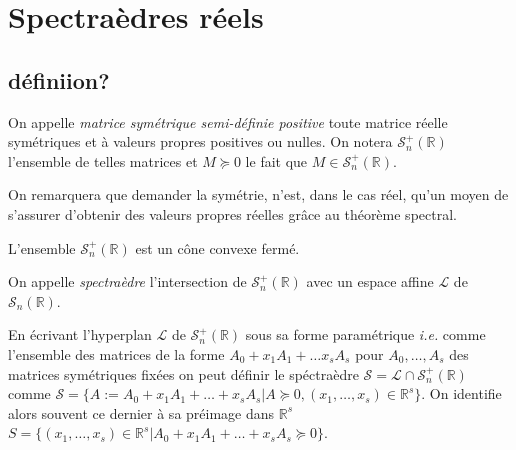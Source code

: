 \section{Spectraèdres réels}

\newcommand\ssp{symétrique semi-définie positive}
\newcommand\ssps{symétriques semi-définies positives}
\newcommand\Ssp{Symétrique semi-définie positive}
\newcommand\Ssps{Symétriques semi-définies positives}

\subsection{définiion?}

\begin{definition}
	On appelle \emph{matrice symétrique semi-définie positive} toute matrice réelle symétriques et à valeurs propres positives ou nulles.
	On notera $\mathcal{S}_n^+\left(\mathbb{R}\right) $ l'ensemble de telles matrices et $M \succeq 0$ le fait que $M \in \mathcal{S}_n^+\left(\mathbb{R}\right)$.
\end{definition}

\begin{remarque}
	On remarquera que demander la symétrie, n'est, dans le cas réel, qu'un moyen de s'assurer d'obtenir des valeurs propres réelles grâce au théorème spectral.
\end{remarque}
\begin{propriete}
	L'ensemble $\mathcal{S}_n^+\left( \mathbb{R} \right) $ est un cône convexe fermé.
\end{propriete}

\begin{definition}
	On appelle \emph{spectraèdre} l'intersection de $\mathcal{S}_n^+\left(\mathbb{R}\right)$ avec un espace affine $\mathcal{L}$ de $\mathcal{S}_n\left(\mathbb{R}\right)$.
\end{definition}

En écrivant l'hyperplan $\mathcal{L}$ de $\mathcal{S}_n^+\left(\mathbb{R}\right)$ sous sa forme paramétrique \textit{i.e.} comme l'ensemble des matrices de la forme $A_0 + x_1 A_1 + \ldots x_s A_s$ pour $A_0,\ldots, A_s$ des matrices symétriques fixées on peut définir le spéctraèdre $\mathcal{S} = \mathcal{L} \cap \mathcal{S}_n^+\left(\mathbb{R}\right)$ comme
$\mathcal{S} = \{A := A_0 + x_1A_1 + \ldots + x_s A_s | A \succeq 0, (x_1,\ldots,x_s) \in \mathbb{R}^s\}$. On identifie alors souvent ce dernier à sa préimage dans $\mathbb{R}^s$
$S = \{(x_1,\ldots,x_s) \in \mathbb{R}^s | A_0+ x_1A_1 + \ldots+ x_s A_s \succeq 0 \}. $

